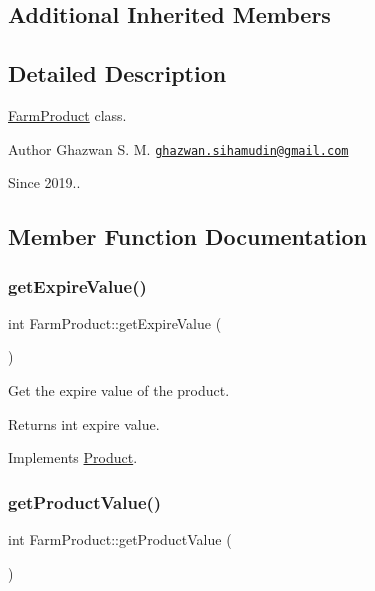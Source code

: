 \subsection*{Additional Inherited Members}


\subsection{Detailed Description}
\hyperlink{classFarmProduct}{Farm\+Product} class.

\begin{DoxyAuthor}{Author}
Ghazwan S. M. \href{mailto:ghazwan.sihamudin@gmail.com}{\tt ghazwan.\+sihamudin@gmail.\+com} 
\end{DoxyAuthor}
\begin{DoxySince}{Since}
2019.. 
\end{DoxySince}


\subsection{Member Function Documentation}
\mbox{\label{classFarmProduct_a2a7526789b3ab01a8fda7773aa2c0565}} 
\subsubsection{\texorpdfstring{get\+Expire\+Value()}{getExpireValue()}}
{\footnotesize\ttfamily int Farm\+Product\+::get\+Expire\+Value (\begin{DoxyParamCaption}{ }\end{DoxyParamCaption})\hspace{0.3cm}{\ttfamily [virtual]}}

Get the expire value of the product. \begin{DoxyReturn}{Returns}
int expire value. 
\end{DoxyReturn}


Implements \hyperlink{classProduct_a739031c520fb9e376da3d3fc2955c7e7}{Product}.

\mbox{\label{classFarmProduct_ae169937bd043517efa0a05be844aaa35}} 
\subsubsection{\texorpdfstring{get\+Product\+Value()}{getProductValue()}}
{\footnotesize\ttfamily int Farm\+Product\+::get\+Product\+Value (\begin{DoxyParamCaption}{ }\end{DoxyParamCaption})\hspace{0.3cm}{\ttfamily [virtual]}}

